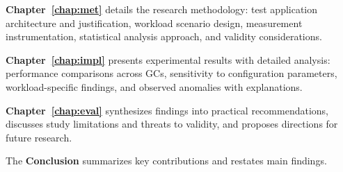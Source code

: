 \textbf{Chapter~\ref{chap:met}} details the research methodology: test application architecture and justification, workload scenario design, measurement instrumentation, statistical analysis approach, and validity considerations.

\textbf{Chapter~\ref{chap:impl}} presents experimental results with detailed analysis: performance comparisons across GCs, sensitivity to configuration parameters, workload-specific findings, and observed anomalies with explanations.

\textbf{Chapter~\ref{chap:eval}} synthesizes findings into practical recommendations, discusses study limitations and threats to validity, and proposes directions for future research.

The \textbf{Conclusion} summarizes key contributions and restates main findings.